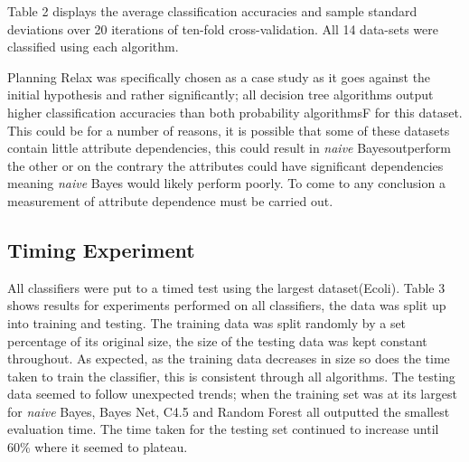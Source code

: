 \documentclass{cmppgr}
\begin{document}
Table 2 displays the average classification accuracies and sample standard deviations over 20 iterations of ten-fold cross-validation. All 14 data-sets were classified using each algorithm.

Planning Relax was specifically chosen as a case study as it goes against the initial hypothesis and rather significantly; all decision tree algorithms output higher classification accuracies than both probability algorithmsF for this dataset. This could be for a number of reasons, 
it is possible that some of these datasets contain little attribute dependencies, this could result in \textit{naive} Bayesoutperform the other or on the contrary the attributes could have significant dependencies meaning \textit{naive} Bayes would likely perform poorly. To come to any conclusion a measurement of attribute dependence must be carried out.


\subsection{Timing Experiment}
All classifiers were put to a timed test using the largest dataset(Ecoli). Table 3 shows results for experiments performed on all classifiers, the data was split up into training and testing. The training data was split randomly by a set percentage of its original size, the size of the testing data was kept constant throughout. As expected, as the training data decreases in size so does the time taken to train the classifier, this is consistent through all algorithms. The testing data seemed to follow unexpected trends; when the training set was at its largest for \textit{naive} Bayes, Bayes Net, C4.5 and Random Forest all outputted the smallest evaluation time. The time taken for the testing set continued to increase until 60\% where it seemed to plateau.
\end{document}
